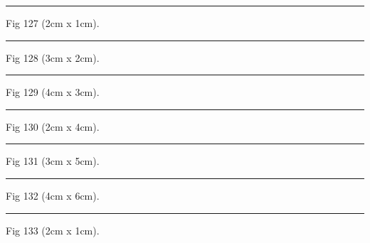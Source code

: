 \documentclass[a4paper,11pt]{article}
\begin{document}
\begin{swarmwrap}%
  \begin{minipage}[t]{2cm}
    \centering
    \rule{\linewidth}{1cm}
    {\footnotesize Fig 127 (2cm x 1cm).}
  \end{minipage}%
\end{swarmwrap}%
\swarmwrapnext
\lipsum[127]%

\begin{swarmwrap}%
  \begin{minipage}[t]{3cm}
    \centering
    \rule{\linewidth}{2cm}
    {\footnotesize Fig 128 (3cm x 2cm).}
  \end{minipage}%
\end{swarmwrap}%
\swarmwrapnext
\lipsum[128]%

\begin{swarmwrap}%
  \begin{minipage}[t]{4cm}
    \centering
    \rule{\linewidth}{3cm}
    {\footnotesize Fig 129 (4cm x 3cm).}
  \end{minipage}%
\end{swarmwrap}%
\swarmwrapnext
\lipsum[129]%

\begin{swarmwrap}%
  \begin{minipage}[t]{2cm}
    \centering
    \rule{\linewidth}{4cm}
    {\footnotesize Fig 130 (2cm x 4cm).}
  \end{minipage}%
\end{swarmwrap}%
\swarmwrapnext
\lipsum[130]%

\begin{swarmwrap}%
  \begin{minipage}[t]{3cm}
    \centering
    \rule{\linewidth}{5cm}
    {\footnotesize Fig 131 (3cm x 5cm).}
  \end{minipage}%
\end{swarmwrap}%
\swarmwrapnext
\lipsum[131]%

\begin{swarmwrap}%
  \begin{minipage}[t]{4cm}
    \centering
    \rule{\linewidth}{6cm}
    {\footnotesize Fig 132 (4cm x 6cm).}
  \end{minipage}%
\end{swarmwrap}%
\swarmwrapnext
\lipsum[132]%

\begin{swarmwrap}%
  \begin{minipage}[t]{2cm}
    \centering
    \rule{\linewidth}{1cm}
    {\footnotesize Fig 133 (2cm x 1cm).}
  \end{minipage}%
\end{swarmwrap}%
\swarmwrapnext
\lipsum[133]%
\end{document}
